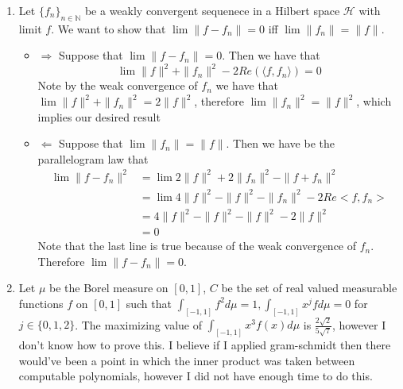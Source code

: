 \documentclass[12pt, letterpaper]{article}
\newcommand{\N}{\mathbb{N}}
\begin{document}
\begin{enumerate}
	\item[9] Let $\{f_n\}_{n \in \N}$ be a weakly convergent sequenece in a Hilbert 
	space $\mathcal{H}$ with limit $f$.  We want to show that 
	$\lim \| f - f_n\| = 0$ iff $\lim \|f_n\| = \|f\|$.
	\begin{itemize}
		\item $\Rightarrow$ Suppose that $\lim \|f - f_n\| = 0$.  Then we have 
		that $$\lim \|f\|^2 + \|f_n\|^2 - 2 Re(\langle f,f_n \rangle) = 0$$
		Note by the weak convergence of $f_n$ we have that 
		$\lim \|f\|^2 + \|f_n\|^2 = 2\|f\|^2$, therefore 
		$\lim \|f_n\|^2 = \|f\|^2$, which implies our desired result
		\item $\Leftarrow$ Suppose that $\lim \|f_n\| = \|f\|$.  
		Then we have be the parallelogram law that 
		\begin{align*}
		\lim \|f - f_n\|^2 &= \lim 2\|f\|^2 + 2\|f_n\|^2 - \|f + f_n\|^2\\
		&= \lim 4 \|f\|^2 - \|f\|^2 - \|f_n\|^2 - 2Re <f,f_n>\\
		&= 4 \|f\|^2 - \|f\|^2 - \|f\|^2 - 2\|f\|^2\\
		&= 0
		\end{align*}
		Note that the last line is true because of the weak convergence of $f_n$.
		Therefore $\lim \|f - f_n\| = 0$.

	\end{itemize}
	\item[10]
	Let $\mu$ be the Borel measure on $[0,1]$, $C$ be the set of real valued measurable
	functions $f$ on $[0,1]$ such that $\int_{[-1,1]} f^2 d \mu = 1, 
	\int_{[-1,1]} x^j f d \mu = 0$ for $j \in \{0,1,2\}$.  
	The maximizing value of $\int_{[-1,1]} x^3 f(x) d\mu$ is 
	$\frac{2\sqrt{2}}{5\sqrt{7}}$, however I don't know how to prove this.  
	I believe if I applied gram-schmidt then there would've been a point in which 
	the inner product was taken between computable polynomials, however I 
	did not have enough time to do this.
\end{enumerate}
\end{document}
